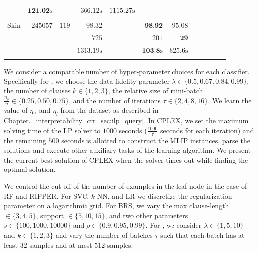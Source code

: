 \begin{table}
\begin{center}
\begin{tabular}{l  r  r r r r r r r rrr}
			& $   \textbf{121.02} \text{s}  $    &       & $   366.12 \text{s}  $    & $   1115.27 \text{s}  $   \\\\ 
			{ Skin}   & $  245057 $  & $  119 $  & $   98.32  $    &   \multicolumn{1}{c}{\multirow{3}{*}{\textemdash}}       & $   \textbf{98.92}  $    & $   95.08  $   \\ & & 
			& $   725 $    &       & $   201 $    & $   \textbf{29} $   \\ & & 
			& $   1313.19 \text{s}  $    &       & $   \textbf{103.8} \text{s}  $    & $   825.6 \text{s}  $   \\\\ 
			\bottomrule
		\end{tabular}
	\end{center}
	
\end{table}



We consider a comparable number  of hyper-parameter choices  for each classifier. Specifically for {\crr}, we choose the data-fidelity parameter $ \lambda \in \{0.5, 0.67, 0.84, 0.99\} $, the number of clauses $ k \in \{1,2,3\} $, the relative size of mini-batch $ \frac{n_p}{n} \in \{0.25, 0.50, 0.75\} $, and the number of iterations $ \tau \in \{2,4,8,16\} $. We learn the value of $ \eta_c $ and $ \eta_{l} $ from the dataset as described in Chapter.~\ref{interpretability_crr_sec:ilp_query}.  In CPLEX, we set the  maximum solving time of the LP solver to $ 1000 $  seconds ($ \frac{ 1000 }{\tau} $ seconds for each iteration) and the remaining $ 500 $ seconds is allotted to construct the MLIP instances, parse the solutions and execute  other auxiliary tasks of the learning algorithm. We present the current best solution of CPLEX when the solver times out while finding the optimal solution.  

We control the cut-off of the number of examples in the leaf node in the case of RF and RIPPER. For SVC, $ k $-NN, and LR we discretize the regularization parameter on a logarithmic grid. For BRS, we vary the max clause-length $ \in \{3,4,5\} $, support $ \in  \{5,10,15\} $, and two other parameters $ s \in \{100,1000,10000\} $ and $ \rho \in \{0.9,0.95,0.99\} $.  For  {\IMLI}, we consider  $ \lambda \in \{1,5,10\} $ and  $ k \in \{1,2,3\} $ and  vary the number of batches $ \tau $ such that each batch has at least $ 32 $ samples and at most $ 512 $ samples.  




